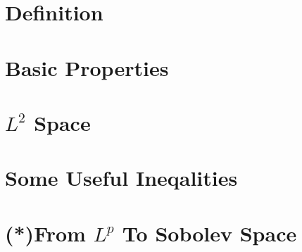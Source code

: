 \section{Definition}
\section{Basic Properties}
\section{$L^{2}$ Space}
\section{Some Useful Ineqalities}
\section{(*)From $L^{p}$ To Sobolev Space}